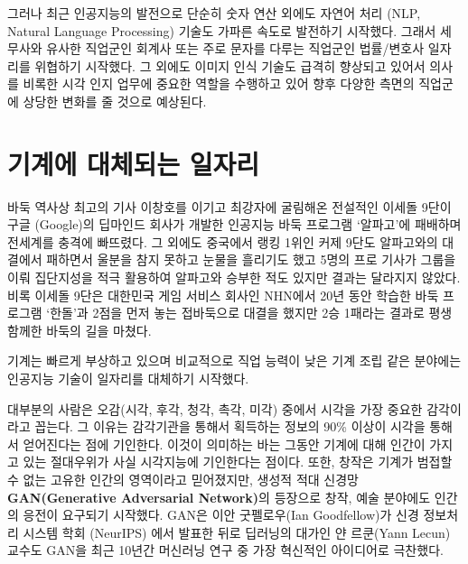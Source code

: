\documentclass[smallextended]{svjour3}       %
\begin{document}
그러나 최근 인공지능의 발전으로 단순히 숫자 연산 외에도 자연어 처리
(NLP, Natural Language Processing) 기술도 가파른 속도로 발전하기
시작했다. 그래서 세무사와 유사한 직업군인 회계사 또는 주로 문자를 다루는
직업군인 법률/변호사 일자리를 위협하기 시작했다. 그 외에도 이미지 인식
기술도 급격히 향상되고 있어서 의사를 비록한 시각 인지 업무에 중요한
역할을 수행하고 있어 향후 다양한 측면의 직업군에 상당한 변화를 줄 것으로
예상된다.

\hypertarget{challenge-to-human}{%
\section{기계에 대체되는 일자리}\label{challenge-to-human}}

바둑 역사상 최고의 기사 이창호를 이기고 최강자에 굴림해온 전설적인
이세돌 9단이 구글 (Google)의 딥마인드 회사가 개발한 인공지능 바둑
프로그램 `알파고'에 패배하며 전세계를 충격에 빠뜨렸다. 그 외에도
중국에서 랭킹 1위인 커제 9단도 알파고와의 대결에서 패하면서 울분을 참지
못하고 눈물을 흘리기도 했고 5명의 프로 기사가 그룹을 이뤄 집단지성을
적극 활용하여 알파고와 승부한 적도 있지만 결과는 달라지지 않았다. 비록
이세돌 9단은 대한민국 게임 서비스 회사인 NHN에서 20년 동안 학습한 바둑
프로그램 `한돌'과 2점을 먼저 놓는 접바둑으로 \cite{zdnet_2019} 대결을
했지만 2승 1패라는 결과로 평생 함께한 바둑의 길을 마쳤다.

기계\cite{brynjolfsson2014second, ford2015rise, kaplan2015humans, chang_2017}는
빠르게 부상하고 있으며 비교적으로 직업 능력이 낮은 기계 조립 같은
분야에는 인공지능 기술이 일자리를 대체하기 시작했다.

대부분의 사람은 오감(시각, 후각, 청각, 촉각, 미각) 중에서 시각을 가장
중요한 감각이라고 꼽는다. 그 이유는 감각기관을 통해서 획득하는 정보의
90\% 이상이 시각을 통해서 얻어진다는 점에 기인한다. 이것이 의미하는 바는
그동안 기계에 대해 인간이 가지고 있는 절대우위가 사실 시각지능에
기인한다는 점이다. 또한, 창작은 기계가 범접할 수 없는 고유한 인간의
영역이라고 믿어졌지만, 생성적 적대 신경망 \textbf{GAN(Generative
Adversarial Network)}\cite{brownlee_2019, hui_2018}의 등장으로 창작,
예술 분야에도 인간의 응전이 요구되기 시작했다. GAN은 이안 굿펠로우(Ian
Goodfellow)가 신경 정보처리 시스템 학회 (NeurIPS) 에서 발표한 뒤로
딥러닝의 대가인 얀 르쿤(Yann Lecun) 교수도 GAN을 최근 10년간 머신러닝
연구 중 가장 혁신적인 아이디어로 극찬했다.
\end{document}
